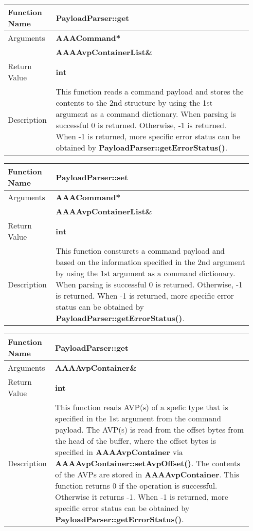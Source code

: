 \begin{flushleft}
\begin{tabular}[t]{|l|p{3in}|}\hline
 Function Name & {\bf PayloadParser::get} \\\hline 

 Arguments & {\bf AAACommand*} \\\cline{2-2} 
           & {\bf AAAAvpContainerList\&} \\\hline
 Return Value & {\bf int} \\\hline 
 Description & This function reads a
 command payload and stores the contents to the 2nd structure by using 
 the 1st argument as a command dictionary.  
 When parsing is successful 0 is returned.  Otherwise, -1 is returned.
 When -1 is returned, more specific error status can be obtained by 
 {\bf PayloadParser::getErrorStatus()}.
\\\hline
\end{tabular}
\end{flushleft}

\begin{flushleft}
\begin{tabular}[t]{|l|p{3in}|}\hline
 Function Name & {\bf PayloadParser::set} \\\hline 

 Arguments & {\bf AAACommand*} \\\cline{2-2} 
           & {\bf AAAAvpContainerList\&} \\\hline
 Return Value & {\bf int} \\\hline 
 Description & This function consturcts a
 command payload and based on the information specified 
 in the 2nd argument by using the 1st argument as a command dictionary.  
 When parsing is successful 0 is returned.  Otherwise, -1 is returned.
 When -1 is returned, more specific error status can be obtained by 
 {\bf PayloadParser::getErrorStatus()}.
\\\hline
\end{tabular}
\end{flushleft}
\clearpage

\begin{flushleft}
\begin{tabular}[t]{|l|p{3in}|}\hline
 Function Name & {\bf PayloadParser::get}
\\\hline
 Arguments & {\bf AAAAvpContainer\&}
\\\hline
 Return Value & {\bf int}
\\\hline
 Description &  
 This function reads AVP(s) of a spefic type that is specified 
 in the 1st argument from the command payload.
 The AVP(s) is read from the offset bytes from the head of the buffer, 
 where the offset bytes is specified in {\bf AAAAvpContainer}
 via {\bf AAAAvpContainer::setAvpOffset()}.
 The contents of the AVPs are stored in {\bf AAAAvpContainer}.
 This function returns 0 if 
 the operation is successful.  Otherwise it returns -1.  
 When -1 is returned, more specific
 error status can be obtained by {\bf PayloadParser::getErrorStatus()}.
\\\hline
\end{tabular}
\end{flushleft}

